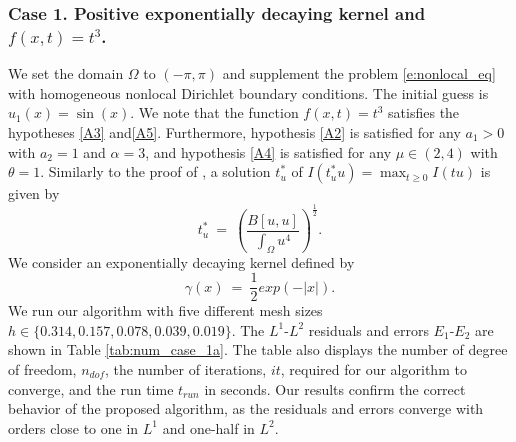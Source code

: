 \documentclass[11pt]{amsart}   	%
\theoremstyle{plain}
\numberwithin{equation}{section}
\newtheorem{remark}[thm]{Remark}
\begin{document}



\subsubsection{Case 1. Positive exponentially decaying kernel and $f(x,t) = t^3$.} \label{sec:num_case_1}
We set the domain $\Omega$ to $(-\pi,\pi)$ and supplement the problem \ref{e:nonlocal_eq} with homogeneous nonlocal Dirichlet boundary conditions. The initial guess is $u_1(x)=\sin(x)$.
We note that the function $f(x,t)=t^3$ satisfies the hypotheses \ref{A3} and\ref{A5}. Furthermore, hypothesis \ref{A2} is satisfied for any $a_1>0$ with $a_2=1$ and $\alpha=3$, and hypothesis \ref{A4} is satisfied for any $\mu\in(2,4)$ with $\theta=1$. 
Similarly to the proof of \cite[Lemma 4]{bailova2021mountain}, a solution $t^*_u$ of $I(t^*_u u)  = \max_{t\geq 0} I(tu)$ is given by
$$t^*_u \ = \ \left( \frac{B[u,u]}{\int_\Omega u^4} \right)^{\frac{1}{2}}.$$
We consider an exponentially decaying kernel defined by
$$ \gamma(x) \ = \ \frac{1}{2} exp(-|x|).$$
We run our algorithm with five different mesh sizes $h\in \{0.314, 0.157, 0.078, 0.039, 0.019\}$. The $L^1$-$L^2$ residuals and errors $E_1$-$E_2$ are shown in Table \ref{tab:num_case_1a}. The table also displays the number of degree of freedom, $n_{dof}$, the number of iterations, $it$, required for our algorithm to converge, and the run time $t_{run}$ in seconds. Our results confirm the correct behavior of the proposed algorithm, as the residuals and errors converge with orders close to one in $L^1$ and one-half in $L^2$.
\end{document}

